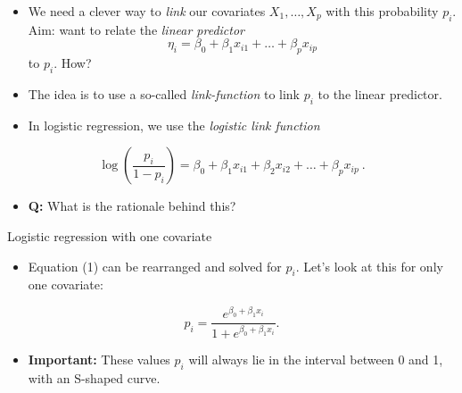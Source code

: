 \documentclass[10pt,ignorenonframetext,]{beamer}
\providecommand{\tightlist}{%
  \setlength{\itemsep}{0pt}\setlength{\parskip}{0pt}}
\begin{document}
\begin{frame}

\begin{itemize}
\item
  We need a clever way to \emph{link} our covariates
  \(X_1, \ldots, X_p\) with this probability \(p_i\). Aim: want to
  relate the \emph{linear predictor}
  \[\eta_i = \beta_0 + \beta_1 x_{i1} + \ldots + \beta_p x_{ip}\] to
  \(p_i\). How?
\item
  The idea is to use a so-called \emph{link-function} to link \(p_i\) to
  the linear predictor.
\item
  In logistic regression, we use the \emph{logistic link function}
\end{itemize}

\begin{equation}
\log\left( \frac{p_i}{1-p_i} \right) = \beta_0 + \beta_1 x_{i1} + \beta_2 x_{i2} + \ldots + \beta_p x_{ip} \ .
\end{equation}

\begin{itemize}
\tightlist
\item
  \textbf{Q:} What is the rationale behind this?
\end{itemize}

\end{frame}

\begin{frame}

\begin{block}{Logistic regression with one covariate}

\vspace{2mm}

\begin{itemize}
\tightlist
\item
  Equation (1) can be rearranged and solved for \(p_i\). Let's look at
  this for only one covariate:
\end{itemize}

\[ p_i= \frac{e^{\beta_0+\beta_1 x_i}}{1 + e^{\beta_0 + \beta_1 x_i}}.\]

\vspace{2mm}

\begin{itemize}
\tightlist
\item
  \textbf{Important:} These values \(p_i\) will always lie in the
  interval between 0 and 1, with an S-shaped curve.
\end{itemize}

\end{block}

\end{frame}
\end{document}
